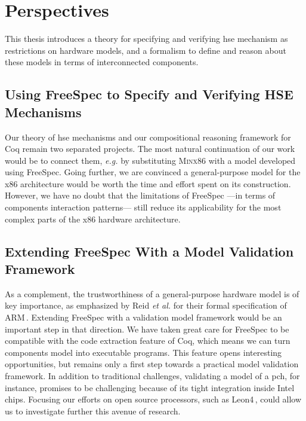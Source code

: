 \section{Perspectives}
\label{sec:conclusion:perspectives}

This thesis introduces a theory for specifying and verifying \ac{hse} mechanism as
restrictions on hardware models, and a formalism to define and reason about
these models in terms of interconnected components.

\subsection*{Using FreeSpec to Specify and Verifying HSE Mechanisms}
%
Our theory of \ac{hse} mechanisms and our compositional reasoning framework for
Coq remain two separated projects.
%
The most natural continuation of our work would be to connect them, \emph{e.g.}
by substituting {\scshape Minx86} with a model developed using FreeSpec.
%
Going further, we are convinced a general-purpose model for the x86 architecture
would be worth the time and effort spent on its construction.
%
However, we have no doubt that the limitations of FreeSpec ---in terms of
components interaction patterns--- still reduce its applicability for the most
complex parts of the x86 hardware architecture.

\subsection*{Extending FreeSpec With a Model Validation Framework}
%
As a complement, the trustworthiness of a general-purpose hardware model is of
key importance, as emphasized by Reid \emph{et al.} for their formal
specification of ARM\,\cite{reid2016armv8}.
%
Extending FreeSpec with a validation model framework would be an important step
in that direction.
%
We have taken great care for FreeSpec to be compatible with the code extraction
feature of Coq, which means we can turn components model into executable
programs.
%
This feature opens interesting opportunities, but remains only a first step
towards a practical model validation framework.
%
In addition to traditional challenges, validating a model of a \ac{pch}, for
instance, promises to be challenging because of its tight integration inside
Intel chips.
%
Focusing our efforts on open source processors, such as
Leon4\,\cite{gaisler2007leon}, could allow us to investigate further this avenue
of research.
